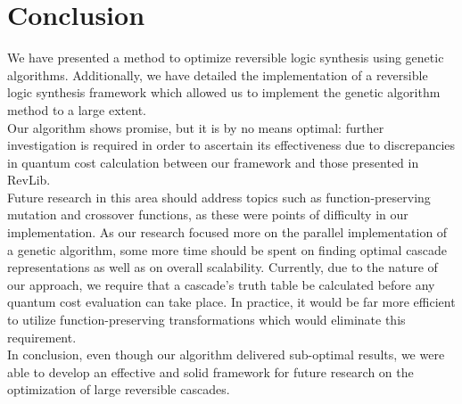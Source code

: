 \section{Conclusion}
We have presented a method to optimize reversible logic synthesis using genetic algorithms. Additionally, we have detailed the implementation of a reversible logic synthesis framework which allowed us to implement the genetic algorithm method to a large extent. \\

Our algorithm shows promise, but it is by no means optimal: further investigation is required in order to ascertain its effectiveness due to discrepancies in quantum cost calculation between our framework and those presented in RevLib. \\

Future research in this area should address topics such as function-preserving mutation and crossover functions, as these were points of difficulty in our implementation. As our research focused more on the parallel implementation of a genetic algorithm, some more time should be spent on finding optimal cascade representations as well as on overall scalability. Currently, due to the nature of our approach, we require that a cascade's truth table be calculated before any quantum cost evaluation can take place. In practice, it would be far more efficient to utilize function-preserving transformations which would eliminate this requirement. \\

In conclusion, even though our algorithm delivered sub-optimal results, we were able to develop an effective and solid framework for future research on the optimization of large reversible cascades.